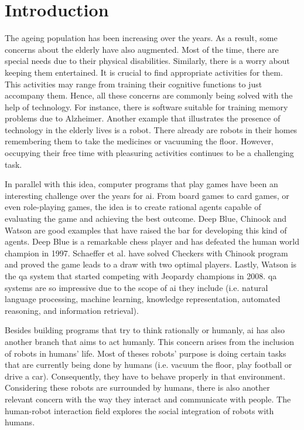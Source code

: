 \section{Introduction} \label{introduction}

The ageing population has been increasing over the years.
As a result, some concerns about the elderly have also augmented.
Most of the time, there are special needs due to their physical disabilities.
Similarly, there is a worry about keeping them entertained.
It is crucial to find appropriate activities for them.
This activities may range from training their cognitive functions to just accompany them.
Hence, all these concerns are commonly being solved with the help of technology.
For instance, there is software suitable for training memory problems due to Alzheimer. 
Another example that illustrates the presence of technology in the elderly lives is a robot.
There already are robots in their homes remembering them to take the medicines or vacuuming the floor.
However, occupying their free time with pleasuring activities continues to be a challenging task.


In parallel with this idea, computer programs that play games have been an interesting challenge over the years for \gls{ai}.
From board games to card games, or even role-playing games, the idea is to create rational agents capable of evaluating the game and achieving the best outcome.
Deep Blue, Chinook and Watson are good examples that have raised the bar for developing this kind of agents.
Deep Blue is a remarkable chess player and has defeated the human world champion in 1997.
Schaeffer et al. have solved Checkers with Chinook program and proved the game leads to a draw with two optimal players.
Lastly, Watson is the \gls{qa} system that started competing with Jeopardy champions in 2008.
\gls{qa} systems are so impressive due to the scope of \gls{ai} they include (i.e. natural language processing, machine learning, knowledge representation, automated reasoning, and information retrieval).

Besides building programs that try to think rationally or humanly, \gls{ai} has also another branch that aims to act humanly.
This concern arises from the inclusion of robots in humans' life.
Most of theses robots' purpose is doing certain tasks that are currently being done by humans (i.e. vacuum the floor, play football or drive a car).
Consequently, they have to behave properly in that environment.
Considering these robots are surrounded by humans, there is also another relevant concern with the way they interact and communicate with people.
The human-robot interaction field explores the social integration of robots with humans.

